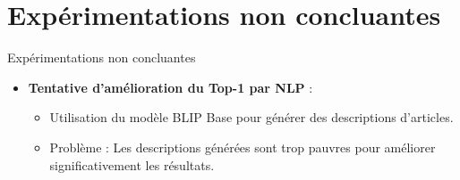 \documentclass{beamer}
\begin{document}
\section{Expérimentations non concluantes}
\begin{frame}{Expérimentations non concluantes}
\begin{itemize}
    \item \textbf{Tentative d'amélioration du Top-1 par NLP} :
    \begin{itemize}
        \item Utilisation du modèle BLIP Base pour générer des descriptions d'articles.
        \item Problème : Les descriptions générées sont trop pauvres pour améliorer significativement les résultats.
    \end{itemize}
\end{itemize}
\begin{table}[h]
    \centering
\end{table}
\end{frame}
\end{document}
